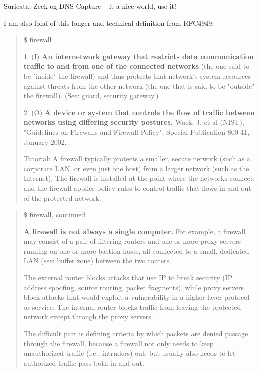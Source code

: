 \documentclass[Screen16to9,17pt]{foils}
\begin{document}

Suricata, Zeek og DNS Capture -- it a nice world, use it!\\
{\small{}}




I am also fond of this longer and technical definition from RFC4949:
\begin{quote}
\$ firewall

      1. (I) {\bf An internetwork gateway that restricts data communication
      traffic to and from one of the connected networks} (the one said to
      be "inside" the firewall) and thus protects that network's system
      resources against threats from the other network (the one that is
      said to be "outside" the firewall). (See: guard, security
      gateway.)

      2. (O) {\bf A device or system that controls the flow of traffic
      between networks using differing security postures.} Wack, J. et al (NIST), "Guidelines on Firewalls and Firewall Policy", Special Publication 800-41,
      January 2002.

      Tutorial: A firewall typically protects a smaller, secure network
      (such as a corporate LAN, or even just one host) from a larger
      network (such as the Internet). The firewall is installed at the
      point where the networks connect, and the firewall applies policy
      rules to control traffic that flows in and out of the protected
      network.
\end{quote}

\begin{quote}
\$ firewall, continued

      {\bf A firewall is not always a single computer.} For example, a
      firewall may consist of a pair of filtering routers and one or
      more proxy servers running on one or more bastion hosts, all
      connected to a small, dedicated LAN (see: buffer zone) between the
      two routers.

      The external router blocks attacks that use IP to
      break security (IP address spoofing, source routing, packet
      fragments), while proxy servers block attacks that would exploit a
      vulnerability in a higher-layer protocol or service. The internal
      router blocks traffic from leaving the protected network except
      through the proxy servers.

      The difficult part is defining criteria by which packets are denied passage through the firewall, because
      a firewall not only needs to keep unauthorized traffic (i.e., intruders) out, but usually also needs to let authorized traffic
      pass both in and out.
\end{quote}
\end{document}
